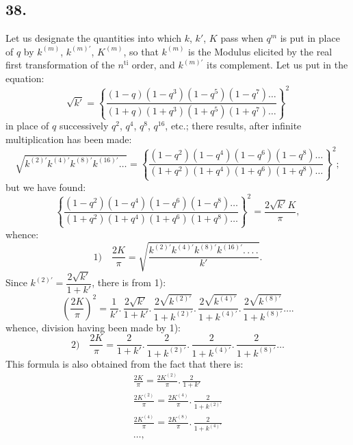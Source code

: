 \documentclass{article}
\begin{document}
\subsection*{38.}

Let us designate the quantities into which $k$, $k'$, $K$ pass when $q^{m}$ is put in place of $q$ by $k^{(m)}$, $k^{(m)\prime}$, $K^{(m)}$, so that $k^{(m)}$ is the Modulus elicited by the real first transformation of the $n^{\mathrm{ti}}$ order, and $k^{(m)\prime}$ its complement. Let us put in the equation:
\[
\sqrt{k'}=\left\{\frac{(1-q)(1-q^{3})(1-q^{5})(1-q^{7})\ldots}{(1+q)(1+q^{3})(1+q^{5})(1+q^{7})\ldots}\right\}^{2}
\]
in place of $q$ successively $q^{2}$, $q^{4}$, $q^{8}$, $q^{16}$, etc.; there results, after infinite multiplication has been made:
\[
\sqrt{k^{(2)\prime}k^{(4)\prime}k^{(8)\prime}k^{(16)\prime}\ldots}=\left\{\frac{(1-q^{2})(1-q^{4})(1-q^{6})(1-q^{8})\ldots}{(1+q^{2})(1+q^{4})(1+q^{6})(1+q^{8})\ldots}\right\}^{2};
\]
but we have found:
\[
\left\{\frac{(1-q^{2})(1-q^{4})(1-q^{6})(1-q^{8})\ldots}{(1+q^{2})(1+q^{4})(1+q^{6})(1+q^{8})\ldots}\right\}^{2}=\frac{2\sqrt{k'}K}{\pi},
\]
whence:
\[
\text{1)}\quad\frac{2K}{\pi}=\sqrt{\frac{k^{(2)\prime}k^{(4)\prime}k^{(8)\prime}k^{(16)\prime}.\,.\,.\,.}{k'}}.
\]
Since $k^{(2)\prime}=\dfrac{2\sqrt{k'}}{1+k'}$, there is from 1):
\[
\left(\frac{2K}{\pi}\right)^{2}=\frac{1}{k'}.\,\frac{2\sqrt{k'}}{1+k'}.\,\frac{2\sqrt{k^{(2)\prime}}}{1+k^{(2)\prime}}.\,\frac{2\sqrt{k^{(4)\prime}}}{1+k^{(4)\prime}}.\,\frac{2\sqrt{k^{(8)\prime}}}{1+k^{(8)\prime}}\ldots.
\]
whence, division having been made by 1):
\[
\text{2)}\quad\frac{2K}{\pi}=\frac{2}{1+k'}.\,\frac{2}{1+k^{(2)\prime}}.\,\frac{2}{1+k^{(4)\prime}}.\,\frac{2}{1+k^{(8)\prime}}\ldots
\]
This formula is also obtained from the fact that there is:
\[
\begin{gathered}
\frac{2K}{\pi}=\frac{2K^{(2)}}{\pi}.\,\frac{2}{1+k'}
\\[2ex]
\frac{2K^{(2)}}{\pi}=\frac{2K^{(4)}}{\pi}.\,\frac{2}{1+k^{(2)\prime}}
\\[2ex]
\frac{2K^{(4)}}{\pi}=\frac{2K^{(8)}}{\pi}.\,\frac{2}{1+k^{(4)\prime}}
\\[2ex]
\ldots,
\end{gathered}
\]
\end{document}
